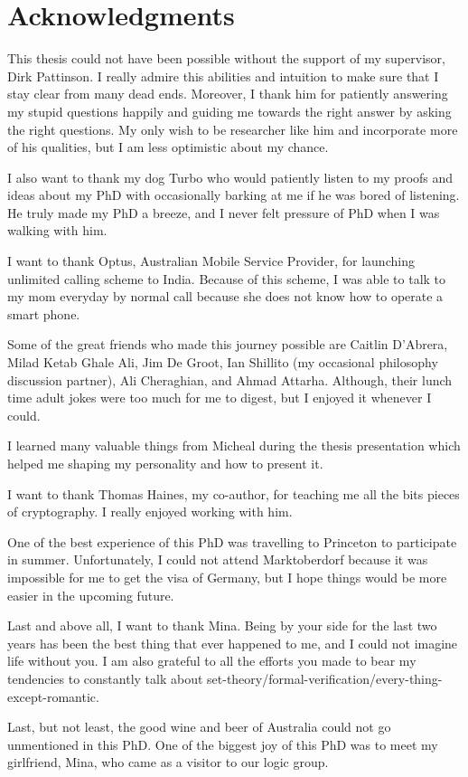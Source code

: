 \chapter*{Acknowledgments}
This thesis could not have been possible without the support of my supervisor, Dirk Pattinson. I really 
admire this abilities and intuition to make sure that I stay clear from many dead ends. Moreover, 
I thank him for patiently answering my stupid questions happily and guiding me towards the right 
answer by asking the right questions. My only wish to be researcher like 
him and incorporate more of his qualities, but I am less optimistic about my chance. 

I also want to thank my dog Turbo who would patiently listen to my proofs
and ideas about my PhD with occasionally barking at me if he was bored of listening. He truly made my PhD a breeze, 
and I never felt pressure of PhD when I was walking with him. 

I want to thank Optus, Australian Mobile Service Provider, for launching unlimited calling scheme to India. 
Because of this scheme, I was able to talk to my mom everyday by normal call because she does not know how 
to operate a smart phone. 
 
Some of the great friends who made this journey possible are Caitlin D'Abrera, Milad Ketab Ghale Ali,  Jim De Groot, 
Ian Shillito (my occasional philosophy discussion partner), Ali Cheraghian, and Ahmad Attarha. Although, 
 their lunch time adult jokes were too much for me to digest, but I enjoyed it whenever I could.  
 
 I learned many valuable things 
 from Micheal during the thesis presentation which helped me shaping my personality and how to present it. 
 
 I want to thank Thomas Haines, my co-author,  for teaching me all the bits pieces of cryptography. I really 
 enjoyed working with him. 
 
 One of the best experience of this PhD was travelling to Princeton to participate in summer. 
 Unfortunately, I could not attend Marktoberdorf because it was impossible for me to get the visa of Germany, but I hope
 things would be more easier in the upcoming future. 
 
 Last and above all, I want to thank Mina. Being by your side for the last two years has been the best thing that ever happened to me, and I could not 
 imagine life without you.   I am also grateful to all the efforts you made to bear my tendencies to constantly
  talk about set-theory/formal-verification/every-thing-except-romantic.

 Last, but not least, the good wine and beer of Australia could not go unmentioned in this PhD. 
One of the biggest joy of this PhD was to meet my girlfriend, Mina, who came as a visitor to our logic group. 

